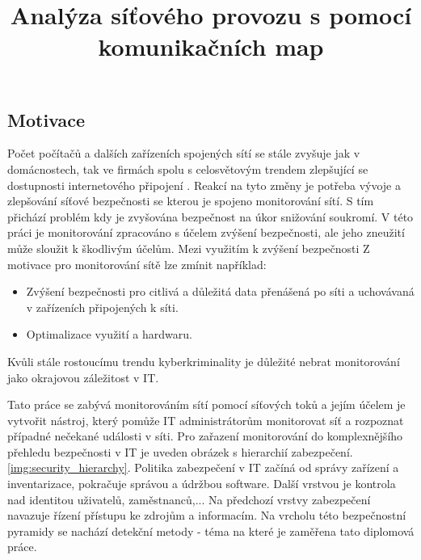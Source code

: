 \documentclass[thesis=M,czech]{FITthesis}[2012/06/26]
\title{Analýza síťového provozu s pomocí komunikačních map}
\begin{document}
\renewcommand{\thefigure}{\arabic{figure}}

\begin{introduction}
\section{Motivace}
Počet počítačů a dalších zařízeních spojených sítí se stále zvyšuje jak v domácnostech, tak ve firmách spolu s celosvětovým trendem zlepšující se dostupnosti internetového připojení \cite{itgrowing}. Reakcí na tyto změny je potřeba vývoje a zlepšování síťové bezpečnosti se kterou je spojeno monitorování sítí. S tím přichází problém kdy je zvyšována bezpečnost na úkor snižování soukromí. V této práci je monitorování zpracováno s účelem zvýšení bezpečnosti, ale jeho zneužití může sloužit k škodlivým účelům. Mezi využitím k zvýšení bezpečnosti Z motivace pro monitorování sítě lze zmínit například:
\begin{itemize}
	\item Zvýšení bezpečnosti pro citlivá a důležitá data přenášená po síti a uchovávaná v zařízeních připojených k síti.
	\item Optimalizace využití a hardwaru. 
\end{itemize}
Kvůli stále rostoucímu trendu kyberkriminality je důležité nebrat monitorování jako okrajovou záležitost v IT.\cite{cybercrime}
\par
Tato práce se zabývá monitorováním sítí pomocí síťových toků a jejím účelem je vytvořit nástroj, který pomůže IT administrátorům monitorovat síť a rozpoznat případné nečekané události v síti. 
Pro zařazení monitorování do komplexnějšího přehledu bezpečnosti v IT je uveden obrázek s hierarchií zabezpečení.\ref{img:security_hierarchy}. Politika zabezpečení v IT začíná od správy zařízení a inventarizace, pokračuje správou a údržbou software. Další vrstvou je kontrola nad identitou uživatelů, zaměstnanců,... Na předchozí vrstvy zabezpečení navazuje řízení přístupu ke zdrojům a informacím. Na vrcholu této bezpečnostní pyramidy se nachází detekční metody - téma na které je zaměřena tato diplomová práce.\cite{networkhierarchy}


\end{introduction}
\end{document}
